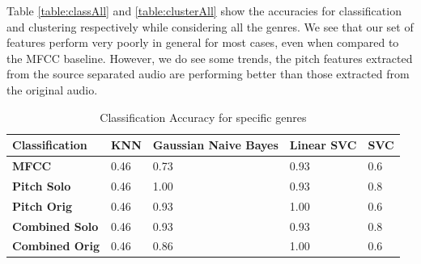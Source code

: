 \documentclass[12pt,journal,compsoc]{IEEEtran}
\begin{document}
\begin{table}[H]
	\centering
    \caption{Clustering Score considering all genres}
    \label{table:clusterAll}
\end{table}

Table \ref{table:classAll} and \ref{table:clusterAll} show the accuracies for classification and clustering respectively while considering all the genres. We see that our set of features perform very poorly in general for most cases, even when compared to the MFCC baseline. However, we do see some trends, the pitch features extracted from the source separated audio are performing better than those extracted from the original audio.

\begin{table}[H]
	\centering
    \begin{tabular}{| p{1.85cm} | l | p{1.8cm} | p{1.5cm} | l |}
    \hline
    \textbf{Classification} & \textbf{KNN} & \textbf{Gaussian Naive Bayes} & \textbf{Linear SVC} & \textbf{SVC} \\ \hline
    \textbf{MFCC} & 0.46 & 0.73 & 0.93 & 0.6 \\ \hline
    \textbf{Pitch Solo} & 0.46 & 1.00 & 0.93 & 0.8 \\ \hline
    \textbf{Pitch Orig} & 0.46 & 0.93 & 1.00 & 0.6 \\ \hline
    \textbf{Combined Solo} & 0.46 & 0.93 & 0.93 & 0.8\\ \hline
    \textbf{Combined Orig} & 0.46 & 0.86 & 1.00 & 0.6 \\
    \hline
    \end{tabular}
    \caption{Classification Accuracy for specific genres}
    \label{table:classReduced}
\end{table}
\end{document}
